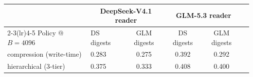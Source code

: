 \begin{tabular}{llcccc}
\toprule
 & \multicolumn{2}{c}{DeepSeek-V4.1 reader} & \multicolumn{2}{c}{GLM-5.3 reader} \\
\cmidrule(lr){2-3}\cmidrule(lr){4-5}
Policy @ $B{=}4096$ & DS digests & GLM digests & DS digests & GLM digests \\
\midrule
compression (write-time) & 0.283 & 0.275 & 0.392 & 0.292 \\
hierarchical (3-tier) & 0.375 & 0.333 & 0.408 & 0.400 \\
\bottomrule
\end{tabular}

